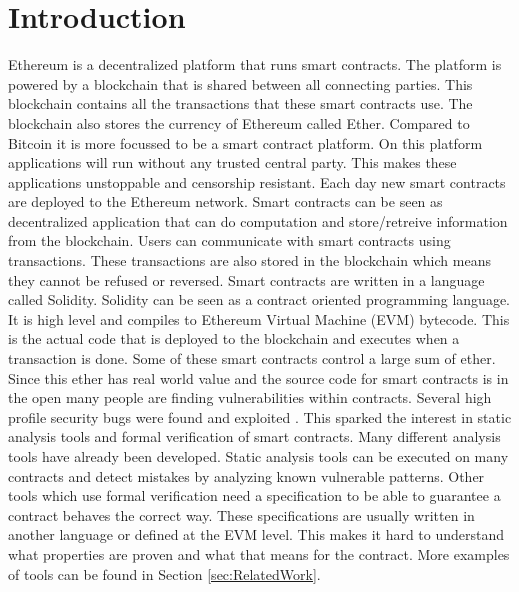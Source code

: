 \documentclass[a4paper]{article}
\begin{document}
\newpage
\tableofcontents
\newpage

\section{Introduction}
Ethereum is a decentralized platform that runs smart contracts. The platform is powered by a blockchain that is shared between all connecting parties. This blockchain contains all the transactions that these smart contracts use. The blockchain also stores the currency of Ethereum called Ether. Compared to Bitcoin it is more focussed to be a smart contract platform. On this platform applications will run without any trusted central party. This makes these applications unstoppable and censorship resistant. Each day new smart contracts are deployed to the Ethereum network. Smart contracts can be seen as decentralized application that can do computation and store/retreive information from the blockchain. Users can communicate with smart contracts using transactions. These transactions are also stored in the blockchain which means they cannot be refused or reversed. Smart contracts are written in a language called Solidity. Solidity can be seen as a contract oriented programming language. It is high level and compiles to Ethereum Virtual Machine (EVM) bytecode. This is the actual code that is deployed to the blockchain and executes when a transaction is done. Some of these smart contracts control a large sum of ether. Since this ether has real world value and the source code for smart contracts is in the open many people are finding vulnerabilities within contracts. Several high profile security bugs were found and exploited \cite{parity1, parity2,hkg,dao}. This sparked the interest in static analysis tools and formal verification of smart contracts. Many different analysis tools have already been developed. Static analysis tools can be executed on many contracts and detect mistakes by analyzing known vulnerable patterns. Other tools which use formal verification need a specification to be able to guarantee a contract behaves the correct way. These specifications are usually written in another language or defined at the EVM level. This makes it hard to understand what properties are proven and what that means for the contract. More examples of tools can be found in Section \ref{sec:RelatedWork}. 
\end{document}
